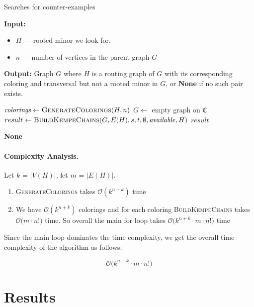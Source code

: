 \begin{algorithm}[H]
    \caption{Searches for counter-examples}
    \label{alg:rooted_minor_search}
    \begin{algorithmic}[1]
      \Statex \textbf{Input:}
      \begin{itemize}
        \item $H$ — rooted minor we look for.
        \item $n$ — number of vertices in the parent graph $G$
      \end{itemize}
      \Statex \textbf{Output:} Graph $G$ where $H$ is a routing graph of $G$ with its corresponding coloring and transversal but not a rooted minor in $G$, or \textbf{None} if no such pair exists.
  
      \State $\textit{colorings} \gets \textsc{GenerateColorings}(H, n)$
        \State $G \gets$ empty graph on $\mathfrak{C}$
        \State $result \gets \textsc{BuildKempeChains}(G, E(H), s, t, \emptyset, \mathit{available}, H)$
          \State \Return $result$ 
        \EndIf
      \EndFor
  
      \State \Return \textbf{None} 
    \end{algorithmic}
  \end{algorithm}

\paragraph{Complexity Analysis.}
Let $k$ = $|V(H)|$, let $m$ = $|E(H)|$.
\begin{enumerate}
    \item \textsc{GenerateColorings} takes $\mathcal{O}(k^{n+k})$ time
    \item We have $\mathcal{O}(k^{n+k})$ colorings and for each coloring \textsc{BuildKempeChains} takes $\mathcal{O}\bigl(m \cdot n!\bigr)$ time.
 So overall the main for loop takes $\mathcal{O}\bigl(k^{n+k} \cdot m \cdot n!\bigr)$ time
\end{enumerate}

Since the main loop dominates the time complexity, we get the overall time complexity of the algorithm as follows:

\[
    \mathcal{O}\bigl(k^{n+k} \cdot m \cdot n!\bigr)
\]

\section{Results}

